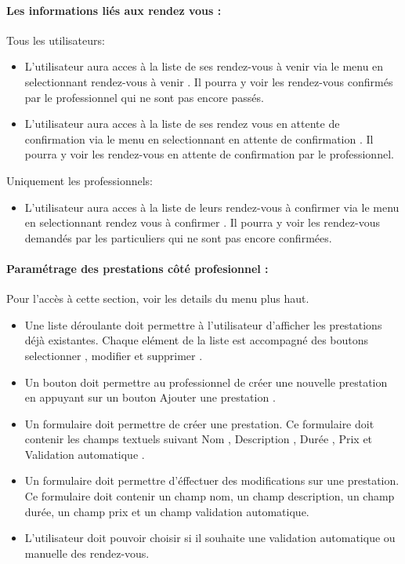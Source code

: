 \documentclass{article}
\begin{document}
\paragraph{Les informations liés aux rendez vous :}
Tous les utilisateurs:
\begin{itemize}
\item L'utilisateur aura acces à la liste de ses rendez-vous à venir via le menu en selectionnant \og rendez-vous à venir \fg{}.
Il pourra y voir les rendez-vous confirmés par le professionnel qui ne sont pas encore passés.

\item L'utilisateur aura acces à la liste de ses rendez vous en attente de confirmation via le menu en selectionnant \og en attente de confirmation \fg{}.
Il pourra y voir les rendez-vous en attente de confirmation par le professionnel.


\end{itemize}
Uniquement les professionnels:
\begin{itemize}
\item L'utilisateur aura acces à la liste de leurs rendez-vous à confirmer via le menu en selectionnant \og rendez vous à confirmer \fg{}.
Il pourra y voir les rendez-vous demandés par les particuliers qui ne sont pas encore confirmées.

\end{itemize}

\paragraph{Paramétrage des prestations côté profesionnel :}
Pour l'accès à cette section, voir les details du menu plus haut.
\begin{itemize}
\item Une liste déroulante doit permettre à l'utilisateur d'afficher
  les prestations déjà existantes. Chaque elément de la liste est
  accompagné des boutons \og selectionner \fg{}, \og modifier \fg{} et
  \og supprimer \fg{}.

\item Un bouton doit permettre au professionnel de créer une nouvelle
  prestation en appuyant sur un bouton \og Ajouter une prestation
  \fg{}.

\item Un formulaire doit permettre de créer une prestation. Ce
  formulaire doit contenir les champs textuels suivant \og Nom \fg{}, \og Description
 \fg{},  \og Durée \fg{}, \og Prix \fg{} et \og Validation automatique \fg{}.


\item Un formulaire doit permettre d'éffectuer des modifications sur
  une prestation. Ce formulaire doit contenir un champ nom, un champ description, un champ
  durée, un champ prix et un champ validation automatique.
\item L'utilisateur doit pouvoir choisir si il souhaite une validation automatique ou manuelle des rendez-vous.
\end{itemize}
\end{document}
